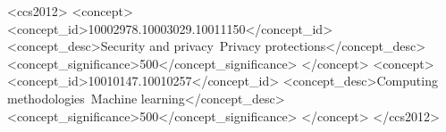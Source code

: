 \documentclass[sigconf]{acmart}
\begin{document}
\begin{abstract}
\end{abstract}

\begin{CCSXML}
<ccs2012>
<concept>
<concept_id>10002978.10003029.10011150</concept_id>
<concept_desc>Security and privacy~Privacy protections</concept_desc>
<concept_significance>500</concept_significance>
</concept>
<concept>
<concept_id>10010147.10010257</concept_id>
<concept_desc>Computing methodologies~Machine learning</concept_desc>
<concept_significance>500</concept_significance>
</concept>
</ccs2012>
\end{CCSXML}







\maketitle






%



%
%




\end{document}
